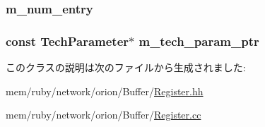 \hypertarget{classRegister_a291c35e9632031ebe307862c5c760519}{
\subsubsection[{m\_\-num\_\-entry}]{ {\bf m\_\-num\_\-entry}}}
\label{classRegister_a291c35e9632031ebe307862c5c760519}
\hypertarget{classRegister_a11d1644aa2bfe0e16783dface6fadf13}{
\subsubsection[{m\_\-tech\_\-param\_\-ptr}]{\setlength{\rightskip}{0pt plus 5cm}const {\bf TechParameter}$\ast$ {\bf m\_\-tech\_\-param\_\-ptr}}}
\label{classRegister_a11d1644aa2bfe0e16783dface6fadf13}


このクラスの説明は次のファイルから生成されました:\begin{DoxyCompactItemize}
\item 
mem/ruby/network/orion/Buffer/\hyperlink{Register_8hh}{Register.hh}\item 
mem/ruby/network/orion/Buffer/\hyperlink{Register_8cc}{Register.cc}\end{DoxyCompactItemize}
